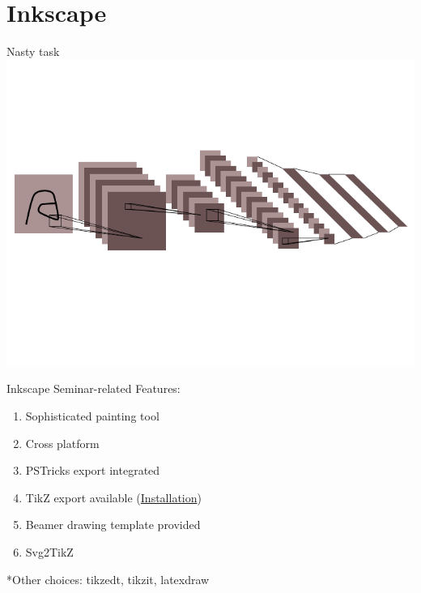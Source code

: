\documentclass[english, nochinese]{../TeXTemplate/pkuslide}
\begin{document}
\section{Inkscape}
\frame{\sectionpage}

\begin{frame}{Nasty task}
\centering 
\includegraphics{./pics/lenet.pdf}
\end{frame}

\begin{frame}{Inkscape}
Seminar-related Features:
\begin{enumerate}
    \item Sophisticated painting tool
    \item Cross platform
    \item PSTricks export integrated 
    \item TikZ export available (\href{http://www.inkscapeforum.com/viewtopic.php?t=17898}{Installation})
    \item Beamer drawing template provided
    \item Svg2TikZ
\end{enumerate}
*Other choices: tikzedt, tikzit, latexdraw
\end{frame}
\end{document}
